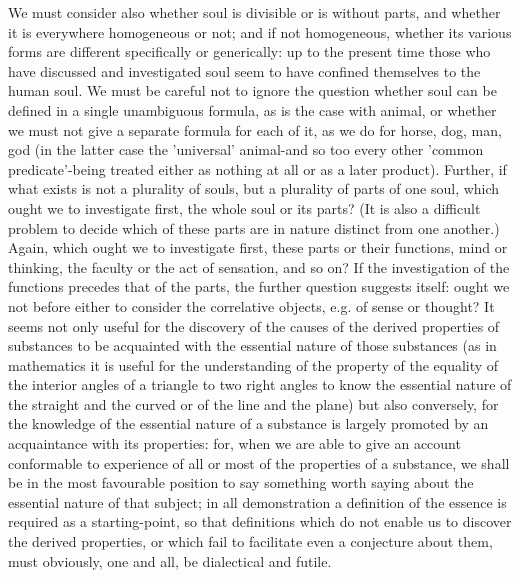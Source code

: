 We must consider also whether soul is divisible or is without parts,
and whether it is everywhere homogeneous or not; and if not homogeneous,
whether its various forms are different specifically or generically:
up to the present time those who have discussed and investigated soul
seem to have confined themselves to the human soul. We must be careful
not to ignore the question whether soul can be defined in a single
unambiguous formula, as is the case with animal, or whether we must
not give a separate formula for each of it, as we do for horse, dog,
man, god (in the latter case the 'universal' animal-and so too every
other 'common predicate'-being treated either as nothing at all or
as a later product). Further, if what exists is not a plurality of
souls, but a plurality of parts of one soul, which ought we to investigate
first, the whole soul or its parts? (It is also a difficult problem
to decide which of these parts are in nature distinct from one another.)
Again, which ought we to investigate first, these parts or their functions,
mind or thinking, the faculty or the act of sensation, and so on?
If the investigation of the functions precedes that of the parts,
the further question suggests itself: ought we not before either to
consider the correlative objects, e.g. of sense or thought? It seems
not only useful for the discovery of the causes of the derived properties
of substances to be acquainted with the essential nature of those
substances (as in mathematics it is useful for the understanding of
the property of the equality of the interior angles of a triangle
to two right angles to know the essential nature of the straight and
the curved or of the line and the plane) but also conversely, for
the knowledge of the essential nature of a substance is largely promoted
by an acquaintance with its properties: for, when we are able to give
an account conformable to experience of all or most of the properties
of a substance, we shall be in the most favourable position to say
something worth saying about the essential nature of that subject;
in all demonstration a definition of the essence is required as a
starting-point, so that definitions which do not enable us to discover
the derived properties, or which fail to facilitate even a conjecture
about them, must obviously, one and all, be dialectical and futile.

